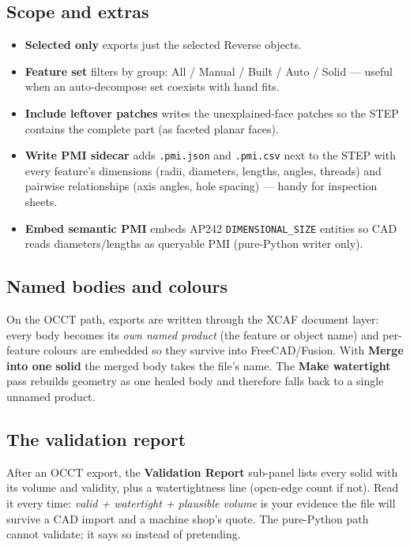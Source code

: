 \documentclass[11pt,a4paper]{article}
\newcommand{\ui}[1]{\textsf{\textbf{#1}}}   %
\begin{document}
\subsection{Scope and extras}

\begin{itemize}[nosep]
  \item \ui{Selected only} exports just the selected Reverse objects.
  \item \ui{Feature set} filters by group: All / Manual / Built / Auto /
    Solid --- useful when an auto-decompose set coexists with hand fits.
  \item \ui{Include leftover patches} writes the unexplained-face patches so
    the STEP contains the complete part (as faceted planar faces).
  \item \ui{Write PMI sidecar} adds \texttt{.pmi.json} and \texttt{.pmi.csv}
    next to the STEP with every feature's dimensions (radii, diameters,
    lengths, angles, threads) and pairwise relationships (axis angles, hole
    spacing) --- handy for inspection sheets.
  \item \ui{Embed semantic PMI} embeds AP242 \texttt{DIMENSIONAL\_SIZE}
    entities so CAD reads diameters/lengths as queryable PMI (pure-Python
    writer only).
\end{itemize}

\subsection{Named bodies and colours}

On the OCCT path, exports are written through the XCAF document layer:
every body becomes its \emph{own named product} (the feature or object
name) and per-feature colours are embedded so they survive into
FreeCAD/Fusion. With \ui{Merge into one solid} the merged body takes the
file's name. The \ui{Make watertight} pass rebuilds geometry as one healed
body and therefore falls back to a single unnamed product.

\subsection{The validation report}

After an OCCT export, the \ui{Validation Report} sub-panel lists every solid
with its volume and validity, plus a watertightness line (open-edge count if
not). Read it every time: \emph{valid + watertight + plausible volume} is
your evidence the file will survive a CAD import and a machine shop's quote.
The pure-Python path cannot validate; it says so instead of pretending.
\end{document}
